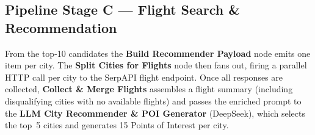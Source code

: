 \documentclass[12pt,a4paper]{report}
\begin{document}
\subsection{Pipeline Stage C --- Flight Search \& Recommendation}
 
From the top-10 candidates the \textbf{Build Recommender Payload} node emits one item per city.
The \textbf{Split Cities for Flights} node then fans out, firing a parallel HTTP call per city to
the SerpAPI flight endpoint. Once all responses are collected, \textbf{Collect \& Merge Flights}
assembles a flight summary (including disqualifying cities with no available flights) and passes
the enriched prompt to the \textbf{LLM City Recommender \& POI Generator} (DeepSeek), which
selects the top~5 cities and generates 15 Points of Interest per city.
 
\end{document}
